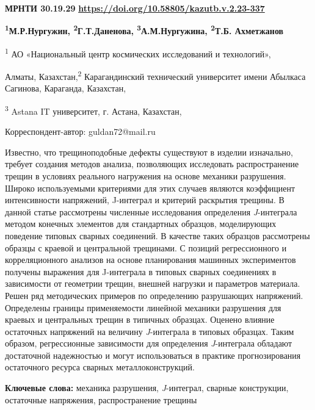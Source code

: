 \newpage
{}
{\bfseries МРНТИ 30.19.29}
\hfill {\bfseries \href{https://doi.org/10.58805/kazutb.v.2.23-337}{https://doi.org/10.58805/kazutb.v.2.23-337}}


\begin{center}
{\bfseries \textsuperscript{1}М.Р.Нургужин, \textsuperscript{2}Г.Т.Даненова\envelope, \textsuperscript{3}А.М.Нургужина, \textsuperscript{2}Т.Б. Ахметжанов}

\textsuperscript{1} АО «Национальный центр космических исследований и
технологий»,

Алматы, Казахстан,\textsuperscript{2} Карагандинский технический
университет имени Абылкаса Сагинова, Караганда, Казахстан,

\textsuperscript{3} Astana IT университет, г. Астана, Казахстан,

\envelope Корреспондент-автор: guldan72@mail.ru
\end{center}

Известно, что трещиноподобные дефекты существуют в изделии изначально,
требует создания методов анализа, позволяющих исследовать
распространение трещин в условиях реального нагружения на основе
механики разрушения. Широко используемыми критериями для этих случаев
являются коэффициент интенсивности напряжений, J-интеграл и критерий
раскрытия трещины. В данной статье рассмотрены численные исследования
определения \emph{J}-интеграла методом конечных элементов для
стандартных образцов, моделирующих поведение типовых сварных соединений.
В качестве таких образцов рассмотрены образцы с краевой и центральной
трещинами. С позиций регрессионного и корреляционного анализов на основе
планирования машинных экспериментов получены выражения для J-интеграла в
типовых сварных соединениях в зависимости от геометрии трещин, внешней
нагрузки и параметров материала. Решен ряд методических примеров по
определению разрушающих напряжений. Определены границы применяемости
линейной механики разрушения для краевых и центральных трещин в типичных
образцах. Оценено влияние остаточных напряжений на величину
\emph{J}-интеграла в типовых образцах. Таким образом, регрессионные
зависимости для определения \emph{J}-интеграла обладают достаточной
надежностью и могут использоваться в практике прогнозирования
остаточного ресурса сварных металлоконструкций.

{\bfseries Ключевые слова:} механика разрушения, \emph{J}-интеграл, сварные
конструкции, остаточные напряжения, распространение трещины

